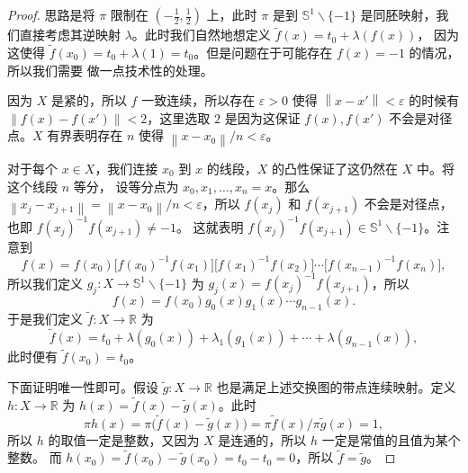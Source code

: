 \documentclass[fontset=none]{Notes}
\newcommand{\norm}[1]{\left\lVert#1\right\rVert}
\begin{document}
\begin{proof}
  思路是将 $\pi$ 限制在 $(-\frac{1}{2},\frac{1}{2})$ 上，此时 $\pi$ 是到 $\mathbb{S}^1 \smallsetminus\{-1\}$
  是同胚映射，我们直接考虑其逆映射 $\lambda$。此时我们自然地想定义 $\tilde f(x)=t_0+\lambda(f(x))$，
  因为这使得 $\tilde f(x_0)=t_0+\lambda(1)=t_0$。但是问题在于可能存在 $f(x)=-1$ 的情况，所以我们需要
  做一点技术性的处理。
  
  因为 $X$ 是紧的，所以 $f$ 一致连续，所以存在 $\varepsilon>0$ 使得 $\norm{x-x'}<\varepsilon$ 的时候有
  $\norm{f(x)-f(x')}<2$，这里选取 $2$ 是因为这保证 $f(x),f(x')$ 不会是对径点。$X$
  有界表明存在 $n$ 使得 $\norm{x-x_0}/n<\varepsilon$。

  对于每个 $x\in X$，我们连接 $x_0$ 到 $x$ 的线段，$X$ 的凸性保证了这仍然在 $X$ 中。将这个线段 $n$ 等分，
  设等分点为 $x_0,x_1,\dots,x_n=x$。那么 $\norm{x_j-x_{j+1}}=\norm{x-x_0}/n<\varepsilon$，所以
  $f(x_j)$ 和 $f(x_{j+1})$ 不会是对径点，也即 $f(x_j)^{-1}f(x_{j+1})\neq -1$。
  这就表明 $f(x_j)^{-1}f(x_{j+1})\in \mathbb{S}^1 \smallsetminus\{-1\}$。注意到
  \[
    f(x)=f(x_0)\bigl[f(x_0)^{-1}f(x_1)\bigr]\bigl[f(x_1)^{-1}f(x_2)\bigr]\cdots\bigl[f(x_{n-1})^{-1}f(x_n)\bigr],
  \]
  所以我们定义 $g_j:X\to \mathbb{S}^1 \smallsetminus\{-1\}$ 为
  $g_j(x)=f(x_j)^{-1}f(x_{j+1})$，所以
  \[
    f(x)=f(x_0)g_0(x)g_1(x)\cdots g_{n-1}(x).
  \]
  于是我们定义 $\tilde{f}:X\to \mathbb{R}$ 为
  \[
    \tilde{f}(x)=t_0+\lambda(g_0(x))+\lambda_1(g_1(x))+\cdots+\lambda(g_{n-1}(x)),
  \]
  此时便有 $\tilde{f}(x_0)=t_0$。

  下面证明唯一性即可。假设 $\tilde g:X\to \mathbb{R}$ 也是满足上述交换图的带点连续映射。定义
  $h:X\to \mathbb{R}$ 为 $h(x)=\tilde{f}(x)-\tilde{g}(x)$。此时
  \[
    \pi h(x)=\pi\bigl(\tilde{f}(x)-\tilde{g}(x)\bigr)=\pi \tilde{f}(x)/\pi \tilde{g}(x)=1,
  \]
  所以 $h$ 的取值一定是整数，又因为 $X$ 是连通的，所以 $h$ 一定是常值的且值为某个整数。
  而 $h(x_0)=\tilde{f}(x_0)-\tilde{g}(x_0)=t_0-t_0=0$，所以 $\tilde{f}=\tilde{g}$。
\end{proof}
\end{document}
